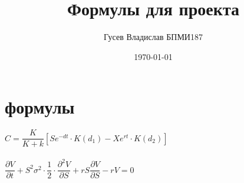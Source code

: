 \documentclass[a4paper]{article}
\title{Формулы для проекта}
\author{Гусев Владислав БПМИ187}
\date{\today}
\begin{document}
\maketitle

\section*{формулы}
$C = \dfrac{K}{K+k} \left[ Se^{-dt} \cdot K(d_1) - Xe^{rt} \cdot K(d_2)\right]$ \\\\

$\dfrac{\partial V}{\partial t} + S^2 \sigma^2 \cdot \dfrac{1}{2} \cdot \dfrac{\partial^2 V}{\partial S} + rS \dfrac{\partial{V}}{\partial S} - rV = 0$
\end{document}
